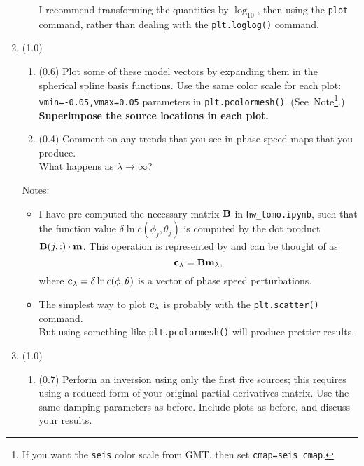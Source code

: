 \documentclass[11pt,titlepage,fleqn]{article}
\newcommand{\tfiletomo}{{\tt hw\_tomo.ipynb}}
\begin{document}
\begin{enumerate}
\begin{enumerate}
I recommend transforming the quantities by $\log_{10}$, then using the \verb+plot+ command, rather than dealing with the \verb+plt.loglog()+ command.

\end{enumerate}


\item (1.0) 

\begin{enumerate}
\item (0.6) Plot some of these model vectors by expanding them in the spherical spline basis functions. Use the same color scale for each plot: \verb+vmin=-0.05,vmax=0.05+ parameters in \verb+plt.pcolormesh()+. (See~Note\footnote{If you want the {\tt seis} color scale from GMT, then set \verb+cmap=seis_cmap+.}.) {\bf Superimpose the source locations in each plot.}

\item (0.4) Comment on any trends that you see in phase speed maps that you produce. \\
What happens as $\lambda \rightarrow \infty$?
\end{enumerate}

Notes:
%
\begin{itemize}
\item I have pre-computed the necessary matrix $\mbox{${\bf B}$}$ in \tfiletomo, such that the function value $\delta\ln c(\phi_j, \theta_j)$ is computed by the dot product $\mbox{${\bf B}$}(j,:) \cdot \mbox{${\bf m}$}$. This operation is represented by  and can be thought of as
%
\begin{equation}
\mbox{${\bf c}$}_{\lambda} = \mbox{${\bf B}$} \mbox{${\bf m}$}_{\lambda},
\end{equation}
%
where $\mbox{${\bf c}$}_{\lambda} = \delta\ln c(\phi, \theta)$ is a vector of phase speed perturbations.

\item The simplest way to plot $\mbox{${\bf c}$}_{\lambda}$ is probably with the \verb+plt.scatter()+ command. \\ But using something like \verb+plt.pcolormesh()+ will produce prettier results.

\end{itemize}

\item (1.0)
%
\begin{enumerate}
\item (0.7) Perform an inversion using only the first five sources; this requires using a reduced form of your original partial derivatives matrix. Use the same damping parameters as before. Include plots as before, and discuss your results.


\end{enumerate}
\end{enumerate}
\end{document}
